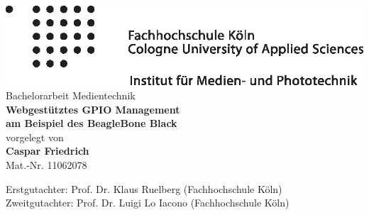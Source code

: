 \begin{titlepage}
\begin{center}

\includegraphics[width = \textwidth]{images/imp_rechts.eps}\\[3cm]

Bachelorarbeit Medientechnik\\[0.5cm]
{\sffamily \bfseries \Huge Webgestütztes GPIO Management\\[0.25cm]
am Beispiel des BeagleBone Black}\\[2cm]

vorgelegt von\\[0.5cm]
\textbf{Caspar Friedrich}\\[0.5cm]
Mat.-Nr. 11062078\\[0.5cm]

\vfill

Erstgutachter: Prof. Dr. Klaus Ruelberg (Fachhochschule Köln)\\[0.5cm]
Zweitgutachter: Prof. Dr. Luigi Lo Iacono (Fachhochschule Köln)\\[0.5cm]
\monthname ~\the\year

\end{center}
\end{titlepage}
